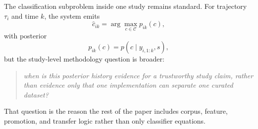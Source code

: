 \documentclass[11pt]{article}
\begin{document}
The classification subproblem inside one study remains standard. For trajectory
\(\tau_i\) and time \(k\), the system emits
\begin{equation}
\hat{c}_{ik}
=
\arg\max_{c \in \mathcal{C}} p_{ik}(c),
\end{equation}
with posterior
\begin{equation}
p_{ik}(c)
=
p(c \mid y_{i,1:k}, s),
\end{equation}
but the study-level methodology question is broader:
\begin{quote}
\textit{when is this posterior history evidence for a trustworthy study claim,
rather than evidence only that one implementation can separate one curated
dataset?}
\end{quote}
That question is the reason the rest of the paper includes corpus, feature,
promotion, and transfer logic rather than only classifier equations.
\end{document}
